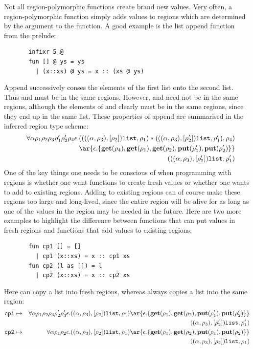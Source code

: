 \documentclass[12pt]{book}
\begin{document}
Not all region-polymorphic functions create brand new values. Very often, a
region-polymorphic function simply adds values to regions which are determined
by the argument to the function. A good example is the list append function
from the prelude:
\begin{verbatim}
       infixr 5 @
       fun [] @ ys = ys
         | (x::xs) @ ys = x :: (xs @ ys)
\end{verbatim}
Append successively conses the elements of the first list onto the second list.
Thus  and  must be in the same regions. However,
  and  need not be in the same regions, although
the elements of  and  clearly must be in the same regions,
since they end up in the same list. These properties of append are summarised
in the inferred region type scheme:
\begin{eqnarray*}
&&\forall\alpha\rho_1\rho_2\rho_3\rho_1'\rho_2'\rho_4\epsilon.
   ( (((\alpha,\rho_3),[\rho_2])\boxml{list},\rho_1)\ast
      (((\alpha,\rho_3),[\rho_2'])\boxml{list},\rho_1'), \rho_4) \\
&&       \ar{\epsilon.\{\Get(\rho_4),\Get(\rho_1),\Get(\rho_2),\Put(\rho_1'),\Put(\rho_2')\}}\\
&&\quad(((\alpha,\rho_3),[\rho_2'])\boxml{list},\rho_1')
\end{eqnarray*}
One of the key things one needs to be conscious of when programming
with regions is whether one want functions to create fresh values or
whether one wants to add to existing regions. Adding to existing
regions can of course make these regions too large and long-lived,
since the entire region will be alive for as long as one of the values
in the region may be needed in the future. Here are two more examples
to highlight the difference between functions that can put values in
fresh regions and functions that add values to existing regions:
\begin{verbatim}
       fun cp1 [] = []   
         | cp1 (x::xs) = x :: cp1 xs
       fun cp2 (l as []) = l
         | cp2 (x::xs) = x :: cp2 xs
\end{verbatim}
Here  can copy a list into fresh regions, whereas  always
copies a list into the same region:
\begin{eqnarray*}
\boxml{cp1}&\mapsto&\forall\alpha\rho_1\rho_2\rho_3\rho_2'\rho_3'\epsilon.
     ((\alpha,\rho_3),[\rho_2])\boxml{list},\rho_1)\ar{\epsilon.\{\Get(\rho_1),\Get(\rho_2),
           \Put(\rho_1'),\Put(\rho_2')\}}\\
&&\quad((\alpha,\rho_3),[\rho_2'])\boxml{list},\rho_1')\\
\boxml{cp2}&\mapsto&\forall\alpha\rho_1\rho_2\epsilon.
     ((\alpha,\rho_3),[\rho_2])\boxml{list},\rho_1)\ar{\epsilon.\{\Get(\rho_1),\Get(\rho_2),
           \Put(\rho_1),\Put(\rho_2)\}}\\
&&\quad((\alpha,\rho_3),[\rho_2])\boxml{list},\rho_1)
\end{eqnarray*}
\end{document}

